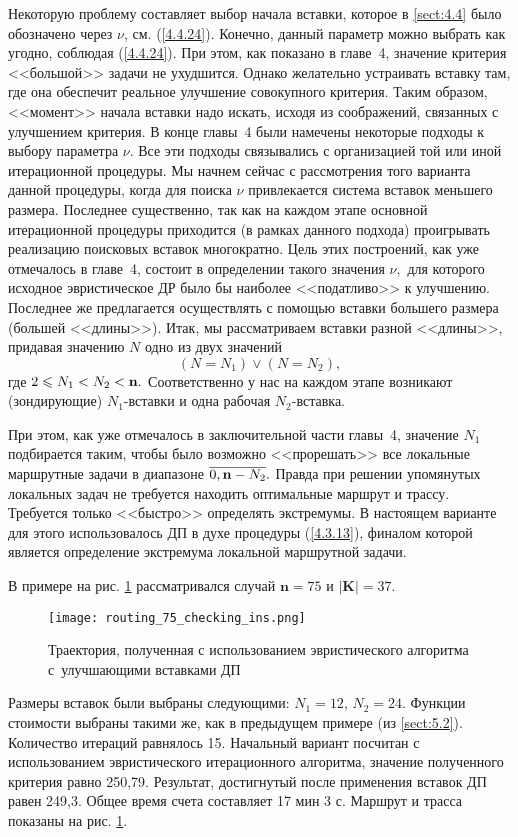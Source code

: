 Некоторую проблему составляет выбор начала вставки,
которое в \ref{sect:4.4}
было обозначено через $\nu$,
см. (\ref{4.4.24}).
Конечно, данный параметр можно выбрать как угодно,
соблюдая (\ref{4.4.24}).
При этом, как показано в
главе~4, значение критерия <<большой>> задачи не ухудшится.
Однако желательно устраивать вставку там,
где она обеспечит реальное улучшение совокупного критерия.
Таким образом, <<момент>> начала вставки надо искать,
исходя из соображений, связанных с улучшением критерия.
В конце главы~4 были намечены некоторые подходы к выбору параметра $\nu.$
Все эти подходы связывались с организацией той или иной итерационной процедуры.
Мы начнем сейчас с рассмотрения того варианта данной процедуры,
когда для поиска $\nu$
привлекается система вставок меньшего размера.
Последнее существенно,
так как на каждом этапе основной итерационной процедуры приходится
(в рамках данного подхода)
проигрывать реализацию поисковых вставок многократно.
Цель этих построений, как  уже отмечалось в главе~4,
состоит в определении такого значения $\nu,$
для которого исходное эвристическое ДР было бы
наиболее <<податливо>> к улучшению.
Последнее же предлагается осуществлять с помощью вставки большего размера
(большей <<длины>>).
Итак, мы рассматриваем вставки разной <<длины>>,
придавая значению $N$ одно из двух значений
$$
  (N = N_1) \vee (N=N_2)
  ,
$$
где $2 \leqslant N_1 < N_2 <{\mathbf n}.$
Соответственно у нас на каждом этапе возникают
(зондирующие)
$N_1$-вставки и одна рабочая $N_2$-вставка.

При этом, как уже отмечалось в заключительной части главы~4,
значение
$N_1$ подбирается таким,
чтобы было возможно <<прорешать>> все локальные маршрутные задачи в диапазоне
$\ov{0,\nn-N_2}.$
Правда при решении упомянутых
локальных задач не требуется находить оптимальные маршрут и трассу.
Требуется только <<быстро>> определять экстремумы.
В настоящем варианте для этого использовалось ДП в духе процедуры (\ref{4.3.13}),
финалом которой является определение экстремума локальной маршрутной задачи.

В примере
на рис. \ref{DP_Inserts_Result}
рассматривался случай
$\mathbf{n}=75$ и $|\mathbf{K}|=37$.

\begin{figure}[H]
  \centering
  \texttt{[image: routing\_75\_checking\_ins.png]}
  \caption{
    Траектория, полученная с использованием эвристического алгоритма
    с~улучшающими вставками ДП
    }
  \label{DP_Inserts_Result}
\end{figure}

Размеры вставок были выбраны следующими:
$N_1=12$, $N_2=24$.
Функции стоимости выбраны такими же, как в предыдущем примере
(из \ref{sect:5.2}).
Количество итераций равнялось 15.
Начальный вариант посчитан с использованием эвристического итерационного алгоритма,
значение полученного критерия равно 250,79.
Результат, достигнутый после применения вставок ДП равен 249,3.
Общее время счета составляет 17 мин 3 с.
Маршрут и трасса показаны
на рис. \ref{DP_Inserts_Result}.
